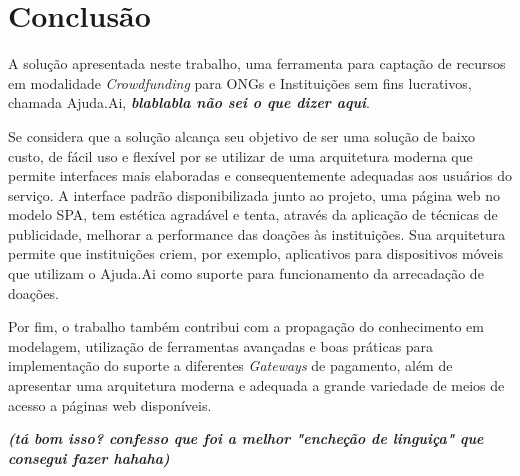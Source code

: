 \chapter{Conclusão}

A solução apresentada neste trabalho, uma ferramenta para captação de recursos em modalidade \emph{Crowdfunding} para ONGs e Instituições sem fins lucrativos, chamada Ajuda.Ai, \textbf{\textit{blablabla não sei o que dizer aqui}}.

Se considera que a solução alcança seu objetivo de ser uma solução de baixo custo, de fácil uso e flexível por se utilizar de uma arquitetura moderna que permite interfaces mais elaboradas e consequentemente adequadas aos usuários do serviço. A interface padrão disponibilizada junto ao projeto, uma página web no modelo SPA, tem estética agradável e tenta, através da aplicação de técnicas de publicidade, melhorar a performance das doações às instituições. Sua arquitetura permite que instituições criem, por exemplo, aplicativos para dispositivos móveis que utilizam o Ajuda.Ai como suporte para funcionamento da arrecadação de doações.

Por fim, o trabalho também contribui com a propagação do conhecimento em modelagem, utilização de ferramentas avançadas e boas práticas para implementação do suporte a diferentes \emph{Gateways} de pagamento, além de apresentar uma arquitetura moderna e adequada a grande variedade de meios de acesso a páginas web disponíveis.

\textbf{\textit{(tá bom isso? confesso que foi a melhor "encheção de linguiça" que consegui fazer hahaha)}}
